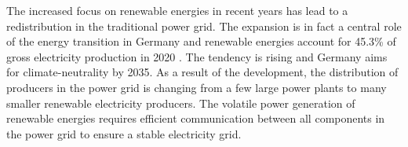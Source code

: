 The increased focus on renewable energies in recent years has lead to a redistribution in the traditional power grid. The expansion is in fact a central role of the energy transition in Germany and renewable energies account for 45.3\% of gross electricity production in 2020 \cite{umwelt}. The tendency is rising and Germany aims for climate-neutrality by 2035.
As a result of the development, the distribution of producers in the power grid is changing from a few large power plants to many smaller renewable electricity producers. The volatile power generation of renewable energies requires efficient communication between all components in the power grid to ensure a stable electricity grid. \\
